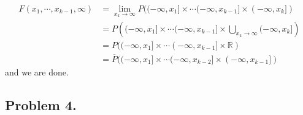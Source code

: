 \documentclass[lang=en,11pt,a4paper,citestyle =authoryear]{elegantpaper}
\newcommand{\R}{\mathbb{R}}
\begin{document}
\[
\begin{aligned}
    F(x_1, \cdots, x_{k-1},\infty) &= \lim\limits_{x_k\to\infty} P((-\infty,x_1]\times \cdots (-\infty,x_{k-1}] \times (-\infty,x_k]) \\
    &=
     P\left((-\infty,x_1]\times \cdots (-\infty,x_{k-1}] \times \bigcup\limits_{x_k\to\infty}(-\infty,x_k]\right) \\
    &=
    P((-\infty,x_1]\times \cdots (-\infty,x_{k-1}] \times \R) \\
    &= \overline{P}((-\infty,x_1]\times \cdots (-\infty,x_{k-2}] \times (-\infty,x_{k-1}])
\end{aligned}
\]
and we are done.
\vspace{0.5em}


\subsection*{Problem 4.} 
\end{document}
